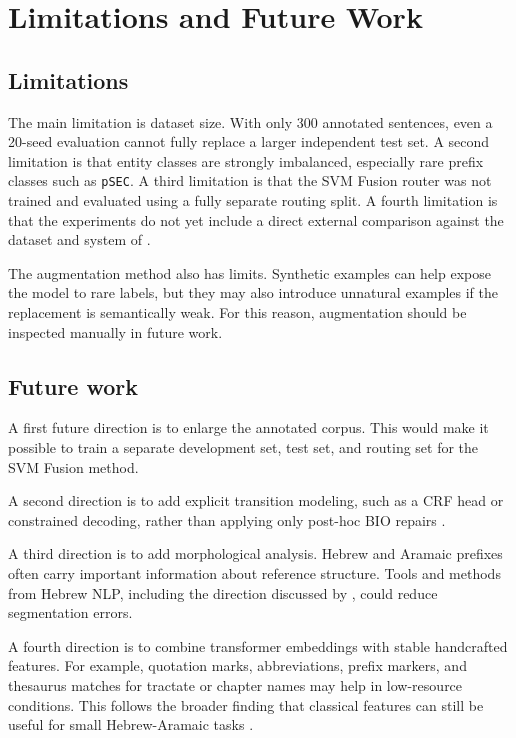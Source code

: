 \documentclass[12pt,a4paper]{report}
\begin{document}
\chapter{Limitations and Future Work}
\section{Limitations}
The main limitation is dataset size. With only 300 annotated sentences, even a 20-seed evaluation cannot fully replace a larger independent test set. A second limitation is that entity classes are strongly imbalanced, especially rare prefix classes such as \texttt{pSEC}. A third limitation is that the SVM Fusion router was not trained and evaluated using a fully separate routing split. A fourth limitation is that the experiments do not yet include a direct external comparison against the dataset and system of \citet{bengigi2025}.

The augmentation method also has limits. Synthetic examples can help expose the model to rare labels, but they may also introduce unnatural examples if the replacement is semantically weak. For this reason, augmentation should be inspected manually in future work.

\section{Future work}
A first future direction is to enlarge the annotated corpus. This would make it possible to train a separate development set, test set, and routing set for the SVM Fusion method.

A second direction is to add explicit transition modeling, such as a CRF head or constrained decoding, rather than applying only post-hoc BIO repairs \citep{lafferty2001crf,ma2016}.

A third direction is to add morphological analysis. Hebrew and Aramaic prefixes often carry important information about reference structure. Tools and methods from Hebrew NLP, including the direction discussed by \citet{tsarfaty2019}, could reduce segmentation errors.

A fourth direction is to combine transformer embeddings with stable handcrafted features. For example, quotation marks, abbreviations, prefix markers, and thesaurus matches for tractate or chapter names may help in low-resource conditions. This follows the broader finding that classical features can still be useful for small Hebrew-Aramaic tasks \citep{hacohen2026}.
\end{document}
